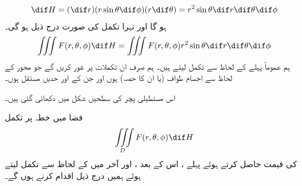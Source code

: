 \begin{align}
\dif H=(\dif r)(r\sin\theta\dif\phi)(r\dif\theta)=r^2\sin\theta \dif r\dif \theta\dif \phi
\end{align}
ہو گا اور تہرا تکمل کی صورت درج ذیل ہو گی۔
\begin{align*}
\iiint F(r,\theta,\phi)\dif H=\iiint F(r,\theta,\phi) r^2\sin\theta\dif r \dif \theta\dif \phi
\end{align*}
ہم عموماً پہلے  کے لحاظ سے تکمل لیتے ہیں۔ ہم  صرف ان تکملات  پر غور کریں گے  جو  محور کے لحاظ سے اجسام طواف  (یا ان کا حصہ) ہوں اور جن کے  اور  حدیں مستقل ہوں۔

اس مستطیلی پچر کی سطحیں شکل  میں دکھائی گئی ہیں۔

فضا میں خطہ  پر تکمل
\begin{align*}
\iiint\limits_D F(r,\theta,\phi)\dif H
\end{align*}
کی قیمت حاصل کرتے ہوئے  پہلے ، اس کے بعد ، اور آخر میں  کے لحاظ سے تکمل لیتے ہوئے ہمیں درج ذیل اقدام کرنے ہوں گے۔


